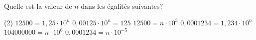 %
%
Quelle est la valeur de $n$ dans les égalités suivantes?
	\begin{tasks} (2)
		\task $12500=1,25\cdot 10^n$
		\task $0,00125\cdot 10^n=125$
		\task $12500=n\cdot 10^3$
		\task $0,0001234=1,234\cdot 10^n$
		\task $104000000=n\cdot 10^6$
		\task $0,0001234=n\cdot 10^{-5}$
	\end{tasks}
